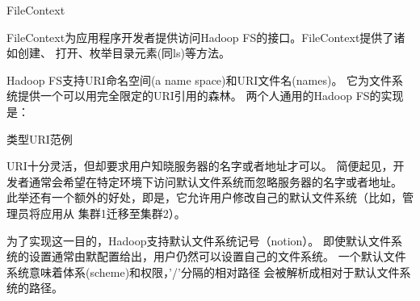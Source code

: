 \begin{XeClass}{FileContext}
   
 FileContext为应用程序开发者提供访问Hadoop FS的接口。FileContext提供了诸如创建、
 打开、枚举目录元素(同ls)等方法。
 
 Hadoop FS支持URI命名空间(a name space)和URI文件名(names)。
 它为文件系统提供一个可以用完全限定的URI引用的森林。
 两个人通用的Hadoop FS的实现是：
 \begin{XeDuoLineTabular}{类型}{URI范例}
 \end{XeDuoLineTabular}
 
 URI十分灵活，但却要求用户知晓服务器的名字或者地址才可以。
 简便起见，开发者通常会希望在特定环境下访问默认文件系统而忽略服务器的名字或者地址。
 此举还有一个额外的好处，即是，它允许用户修改自己的默认文件系统（比如，管理员将应用从
 集群1迁移至集群2）。
 
 为了实现这一目的，Hadoop支持默认文件系统记号（notion）。
 即使默认文件系统的设置通常由默配置给出，用户仍然可以设置自己的文件系统。
 一个默认文件系统意味着体系(scheme)和权限，'/'分隔的相对路径
 会被解析成相对于默认文件系统的路径。

\end{XeClass}
